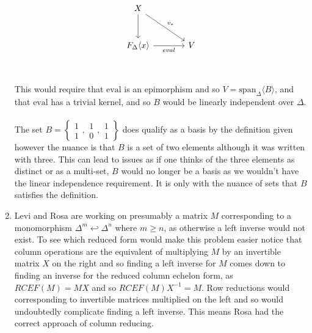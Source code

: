 \documentclass[12pt]{amsart}
\theoremstyle{definition}
\newcommand{\ip}[1]{\langle#1\rangle}
\begin{document}
\begin{enumerate}[start=0]
\[\begin{tikzcd}[row sep=1cm, column sep=.65cm]
     X\arrow[drr, "v_*"]\arrow[d]&\\
     F_\Delta\ip x\arrow[rr, "eval"']&&V\\
    \end{tikzcd}\]
This would require that $\text{eval}$ is an epimorphism and so $V=\text{span}_\Delta\ip{B}$, and that $\text{eval}$ has a trivial kernel, and so $B$ would be linearly independent over $\Delta$.\\ \\
The set $B=\left\{\boxed{\begin{matrix}1\\ 1\end{matrix}},\boxed{\begin{matrix}1\\ 0\end{matrix}},\boxed{\begin{matrix}1\\ 1\end{matrix}}\right\}$ does qualify as a basis by the definition given however the nuance is that $B$ is a set of two elements although it was written with three. This can lead to issues as if one thinks of the three elements as distinct or as a multi-set, $B$ would no longer be a basis as we wouldn't have the linear independence requirement. It is only with the nuance of sets that $B$ satisfies the definition.\\


\item 
Levi and Rosa are working on presumably a matrix $M$ corresponding to a monomorphism $\Delta^m\hookleftarrow \Delta^n$ where $m\geq n$, as otherwise a left inverse would not exist. 
To see which reduced form would make this problem easier notice that column operations are the equivalent of multiplying $M$ by an invertible matrix $X$ on the right and so finding a left inverse for $M$ comes down to finding an inverse for the reduced column echelon form, as $RCEF(M)=MX$ and so $RCEF(M)X^{-1}=M$. Row reductions would corresponding to invertible matrices multiplied on the left and so would undoubtedly complicate finding a left inverse. This means Rosa had the correct approach of column reducing.\\ %


\end{enumerate}
\end{document}
